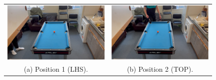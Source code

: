 \documentclass[ %
                author={Finn Alexander Wilkinson},
                supervisor={Dr. Andrew Calway},
                degree={MEng},
                title={\centering A Mixed Reality Aim Assistant for Pool and Snooker},
                subtitle={},
                type={Enterprise},
                year={2021} ]{dissertation}
\begin{document}
\begin{figure}[h!]
    \centering
    \begin{tabular}{cc}
         \includegraphics[scale = 0.15]{Images/Eval/Walk around/Frame 5 - LHS 2.PNG} & \includegraphics[scale = 0.15]{Images/Eval/Walk around/Frame 6 - Back 2.PNG} \\
         (a) Position 1 (LHS). & (b) Position 2 (TOP). \\[6pt]

\end{tabular}
\end{figure}
\end{document}
